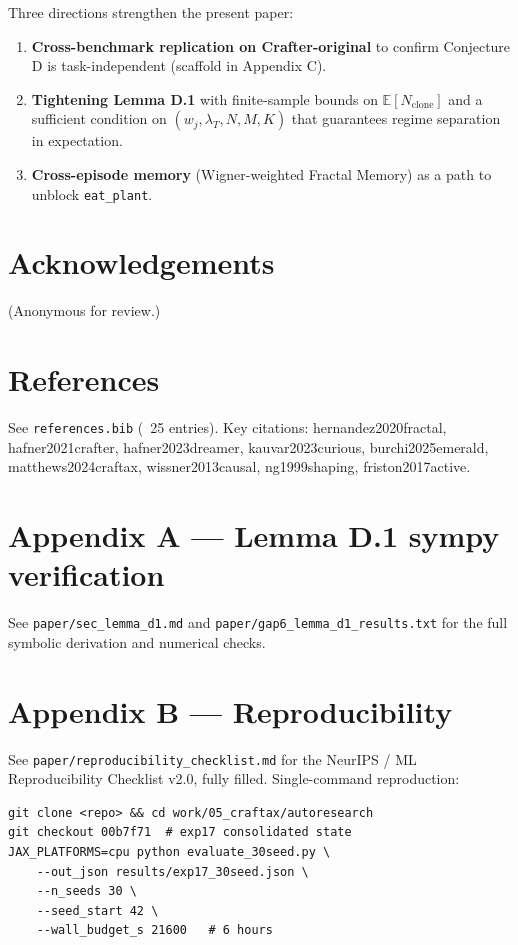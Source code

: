 \documentclass[11pt,letterpaper]{article}
\begin{document}
Three directions strengthen the present paper:

\begin{enumerate}
\item \textbf{Cross-benchmark replication on Crafter-original} to confirm Conjecture D is task-independent (scaffold in Appendix C).
\item \textbf{Tightening Lemma D.1} with finite-sample bounds on $\mathbb{E}[N_{\text{clone}}]$ and a sufficient condition on $(w_j, \lambda_T, N, M, K)$ that guarantees regime separation in expectation.
\item \textbf{Cross-episode memory} (Wigner-weighted Fractal Memory) as a path to unblock \texttt{eat\_plant}.
\end{enumerate}


\section{Acknowledgements}

(Anonymous for review.)

\section{References}

See \texttt{references.bib} (~25 entries). Key citations:
hernandez2020fractal, hafner2021crafter, hafner2023dreamer,
kauvar2023curious, burchi2025emerald, matthews2024craftax,
wissner2013causal, ng1999shaping, friston2017active.

\section{Appendix A — Lemma D.1 sympy verification}

See \texttt{paper/sec\_lemma\_d1.md} and \texttt{paper/gap6\_lemma\_d1\_results.txt} for
the full symbolic derivation and numerical checks.

\section{Appendix B — Reproducibility}

See \texttt{paper/reproducibility\_checklist.md} for the NeurIPS / ML
Reproducibility Checklist v2.0, fully filled. Single-command
reproduction:

\begin{verbatim}
git clone <repo> && cd work/05_craftax/autoresearch
git checkout 00b7f71  # exp17 consolidated state
JAX_PLATFORMS=cpu python evaluate_30seed.py \
    --out_json results/exp17_30seed.json \
    --n_seeds 30 \
    --seed_start 42 \
    --wall_budget_s 21600   # 6 hours
\end{verbatim}
\end{document}

